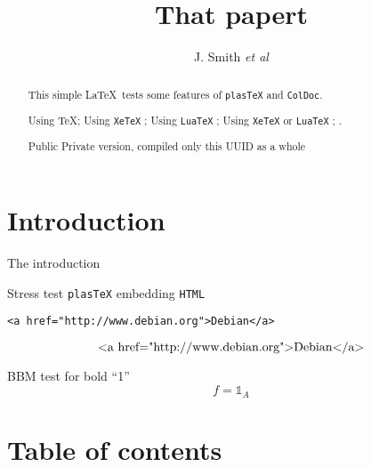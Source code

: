 \documentclass[a4paper]{article}
\newif\ifplastex\plastexfalse
\newcommand\mathbbm[1]{{\mathbb{#1}}}
\newcommand\mathbbm[1]{{\mathbb{#1}}}
\begin{document}
\author{J. Smith
\emph{et al}
}
\title{That papert}
\maketitle
\section*{Introduction}
The introduction

\begin{abstract}
  This simple \LaTeX\ tests some features
  of \texttt{plasTeX} and \texttt{ColDoc}.

  \ifetex Using  \TeX \fi ;
  \ifxetex Using \texttt{XeTeX} \fi ;
  \ifluatex Using \texttt{LuaTeX} \fi ;
  \iftutex Using \texttt{XeTeX} or \texttt{LuaTeX} \fi ;
  \ifplastex Using \texttt{plasTeX} \fi .

  \ifColDocPublic Public \else Private \fi
  version, compiled
  \ifColDocOneUUID only this UUID \else as a whole \fi
\end{abstract}

Stress test  \texttt{plasTeX} embedding \texttt{HTML}
\begin{verbatim}
<a href="http://www.debian.org">Debian</a>
\end{verbatim}
\[ \hbox{<a href="http://www.debian.org">Debian</a>} \]

BBM test for bold ``1''
\[f={\mathbbm{1}}_A\]





\section*{Table of contents}
\tableofcontents



\end{document}
